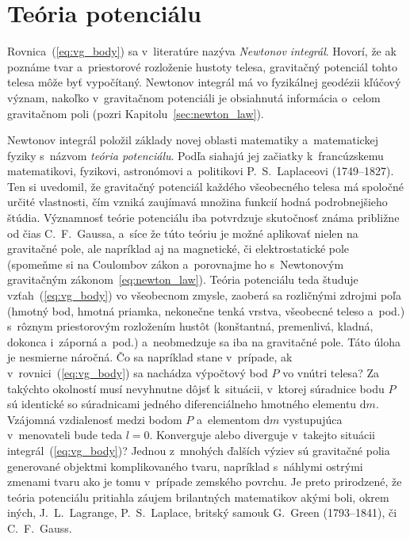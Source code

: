\documentclass[a4paper,12pt]{book}
\newcommand{\diff}{\mathrm d}
\begin{document}
\section{Teória potenciálu}
\label{sec:potential_theory}

Rovnica~(\ref{eq:vg_body}) sa v~literatúre nazýva \emph{Newtonov
integrál}.  Hovorí, že ak poznáme tvar a~priestorové rozloženie hustoty telesa,
gravitačný potenciál tohto telesa môže byť vypočítaný.  Newtonov
integrál má vo fyzikálnej geodézii kľúčový význam, nakoľko v~gravitačnom
potenciáli je obsiahnutá informácia o~celom gravitačnom poli (pozri
Kapitolu~\ref{sec:newton_law}).

Newtonov integrál položil základy novej oblasti matematiky a~matematickej 
fyziky s~názvom \emph{teória potenciálu}.  Podľa \textcite{MacMillan1930} 
siahajú jej začiatky k~francúzskemu matematikovi, fyzikovi, astronómovi 
a~politikovi P.~S.~Laplaceovi (1749--1827).  Ten si uvedomil, že gravitačný 
potenciál každého všeobecného telesa má spoločné určité vlastnosti, čím vzniká 
zaujímavá množina funkcií hodná podrobnejšieho štúdia.  Významnosť teórie 
potenciálu iba potvrdzuje skutočnosť známa približne od čias C.~F.~Gaussa, 
a~síce že túto teóriu je možné aplikovať nielen na gravitačné pole, ale 
napríklad aj na magnetické, či elektrostatické pole (spomeňme si na Coulombov 
zákon a~porovnajme ho s~Newtonovým gravitačným zákonom~\ref{eq:newton_law}).  
Teória potenciálu teda študuje vzťah~(\ref{eq:vg_body}) vo všeobecnom zmysle, 
zaoberá sa rozličnými zdrojmi poľa (hmotný bod, hmotná priamka, nekonečne tenká 
vrstva, všeobecné teleso a~pod.) s~rôznym priestorovým rozložením hustôt 
(konštantná, premenlivá, kladná, dokonca i~záporná a~pod.) a~neobmedzuje sa iba 
na gravitačné pole.  Táto úloha je nesmierne náročná.  Čo sa napríklad stane 
v~prípade, ak v~rovnici~(\ref{eq:vg_body}) sa nachádza výpočtový bod $P$ vo 
vnútri telesa?  Za takýchto okolností musí nevyhnutne dôjsť k~situácii, 
v~ktorej súradnice bodu $P$ sú identické so súradnicami jedného diferenciálneho 
hmotného elementu $\diff m$.  Vzájomná vzdialenosť medzi bodom $P$ a~elementom 
$\diff m$ vystupujúca v~menovateli bude teda $l = 0$.  Konverguje alebo 
diverguje v~takejto situácii integrál~(\ref{eq:vg_body})?  Jednou z~mnohých 
ďalších výziev sú gravitačné polia generované objektmi komplikovaného tvaru, 
napríklad s~náhlymi ostrými zmenami tvaru ako je tomu v~prípade zemského 
povrchu.  Je preto prirodzené, že teória potenciálu pritiahla záujem 
brilantných matematikov akými boli, okrem iných, J.~L.~Lagrange, P.~S.~Laplace, 
britský samouk G.~Green (1793--1841), či C.~F.~Gauss.
\end{document}
